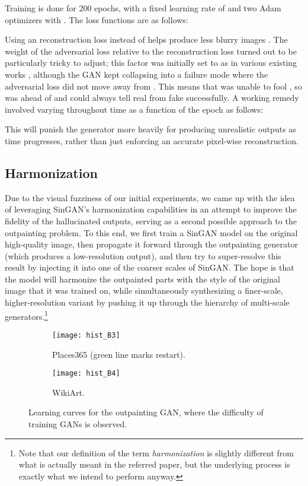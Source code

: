 \documentclass[twocolumn,showpacs,nofootinbib,aps,superscriptaddress,eqsecnum,prd,notitlepage,showkeys,10pt]{revtex4-1}
\begin{document}
\hspace{\parindent} Training is done for 200 epochs, with a fixed learning rate of  and two Adam optimizers with . The loss functions are as follows:

Using an  reconstruction loss instead of  helps produce less blurry images \cite{Huang2018}. The weight of the adversarial loss  relative to the reconstruction loss  turned out to be particularly tricky to adjust; this factor was initially set to  as in various existing works \cite{Pathak2016, Li2018, Sabini2018}, although the GAN kept collapsing into a failure mode where the adversarial loss did not move away from . This means that  was unable to fool , so  was ahead of  and could always tell real from fake successfully. A working remedy involved varying  throughout time as a function of the epoch  as follows:

This will punish the generator more heavily for producing unrealistic outputs as time progresses, rather than just enforcing an accurate pixel-wise reconstruction.

\subsection{Harmonization}

\hspace{\parindent} Due to the visual fuzziness of our initial experiments, we came up with the idea of leveraging SinGAN's harmonization capabilities in an attempt to improve the fidelity of the hallucinated outputs, serving as a second possible approach to the outpainting problem. To this end, we first train a SinGAN model on the original high-quality image, then propagate it forward through the outpainting generator (which produces a low-resolution output), and then try to super-resolve this result by injecting it into one of the coarser scales of SinGAN. The hope is that the model will harmonize the outpainted parts with the style of the original image that it was trained on, while simultaneously synthesizing a finer-scale, higher-resolution variant by pushing it up through the hierarchy of multi-scale generators.\footnote{Note that our definition of the term \textit{harmonization} is slightly different from what is actually meant in the referred paper, but the underlying process is exactly what we intend to perform anyway.}

\begin{figure}[tp]
  \centering
  \begin{subfigure}[b]{\columnwidth}
      \centering
      \texttt{[image: hist\_B3]}
      \caption{Places365 (green line marks restart).}
      \vspace{0.2cm}
  \end{subfigure}
  \begin{subfigure}[b]{\columnwidth}
      \centering
      \texttt{[image: hist\_B4]}
      \caption{WikiArt.}
  \end{subfigure}
  \caption{Learning curves for the outpainting GAN, where the difficulty of training GANs is observed.}
  \label{fig:learn_curves}
\end{figure}
\end{document}

